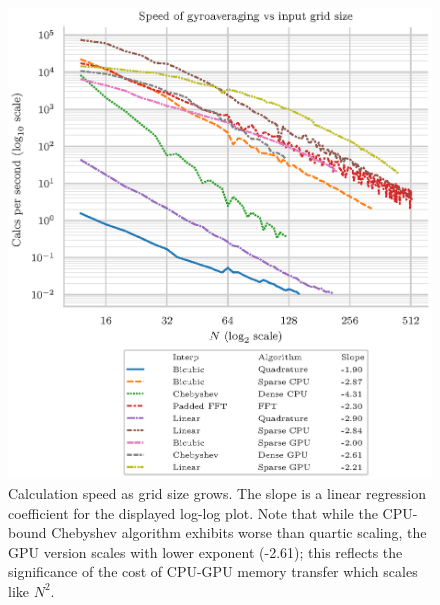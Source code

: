 \begin{enumerate}
	
	\begin{figure}[htbp!] 
 \includegraphics[scale=1]{SpeedVsN.eps}	
 	\caption{Calculation speed as grid size grows.  The slope is a linear regression coefficient for the displayed log-log plot.   Note that while the CPU-bound Chebyshev algorithm exhibits worse than quartic scaling, the GPU version scales with lower exponent (-2.61); this reflects the significance of the cost of CPU-GPU memory transfer which scales like $N^2$. }  	\end{figure}
	

\end{enumerate}
